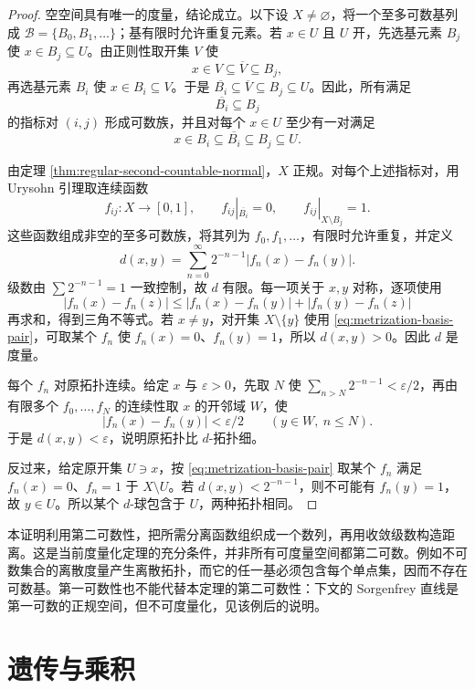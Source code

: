 \begin{proof}
空空间具有唯一的度量，结论成立。以下设 \(X\ne\varnothing\)，将一个至多可数基列成 \(\mathcal B=\{B_0,B_1,\ldots\}\)；基有限时允许重复元素。若 \(x\in U\) 且 \(U\) 开，先选基元素 \(B_j\) 使
\(x\in B_j\subseteq U\)。由正则性取开集 \(V\) 使
\[
 x\in V\subseteq\overline V\subseteq B_j,
\]
再选基元素 \(B_i\) 使 \(x\in B_i\subseteq V\)。于是
\(\overline{B_i}\subseteq\overline V\subseteq B_j\subseteq U\)。因此，所有满足
\[
 \overline{B_i}\subseteq B_j
\]
的指标对 \((i,j)\) 形成可数族，并且对每个 \(x\in U\) 至少有一对满足
\begin{equation}
 x\in B_i\subseteq\overline{B_i}\subseteq B_j\subseteq U.
\label{eq:metrization-basis-pair}
\end{equation}

由定理 \ref{thm:regular-second-countable-normal}，\(X\) 正规。对每个上述指标对，用 Urysohn 引理取连续函数
\[
 f_{ij}:X\to[0,1],\qquad
 f_{ij}|_{\overline{B_i}}=0,\qquad
 f_{ij}|_{X\setminus B_j}=1.
\]
这些函数组成非空的至多可数族，将其列为 \(f_0,f_1,\ldots\)，有限时允许重复，并定义
\[
 d(x,y)=\sum_{n=0}^{\infty}2^{-n-1}|f_n(x)-f_n(y)|.
\]
级数由 \(\sum2^{-n-1}=1\) 一致控制，故 \(d\) 有限。每一项关于 \(x,y\) 对称，逐项使用
\[
 |f_n(x)-f_n(z)|
 \le |f_n(x)-f_n(y)|+|f_n(y)-f_n(z)|
\]
再求和，得到三角不等式。若 \(x\ne y\)，对开集 \(X\setminus\{y\}\) 使用
\eqref{eq:metrization-basis-pair}，可取某个 \(f_n\) 使 \(f_n(x)=0\)、\(f_n(y)=1\)，所以 \(d(x,y)>0\)。因此 \(d\) 是度量。

每个 \(f_n\) 对原拓扑连续。给定 \(x\) 与 \(\varepsilon>0\)，先取 \(N\) 使 \(\sum_{n>N}2^{-n-1}<\varepsilon/2\)，再由有限多个 \(f_0,\ldots,f_N\) 的连续性取 \(x\) 的开邻域 \(W\)，使
\[
 |f_n(x)-f_n(y)|<\varepsilon/2\qquad(y\in W,\ n\le N).
\]
于是 \(d(x,y)<\varepsilon\)，说明原拓扑比 \(d\)-拓扑细。

反过来，给定原开集 \(U\ni x\)，按 \eqref{eq:metrization-basis-pair} 取某个 \(f_n\) 满足 \(f_n(x)=0\)、\(f_n=1\) 于 \(X\setminus U\)。若
\(d(x,y)<2^{-n-1}\)，则不可能有 \(f_n(y)=1\)，故 \(y\in U\)。所以某个 \(d\)-球包含于 \(U\)，两种拓扑相同。
\end{proof}

本证明利用第二可数性，把所需分离函数组织成一个数列，再用收敛级数构造距离。这是当前度量化定理的充分条件，并非所有可度量空间都第二可数。例如不可数集合的离散度量产生离散拓扑，而它的任一基必须包含每个单点集，因而不存在可数基。第一可数性也不能代替本定理的第二可数性：下文的 Sorgenfrey 直线是第一可数的正规空间，但不可度量化，见该例后的说明。

\section{遗传与乘积}

